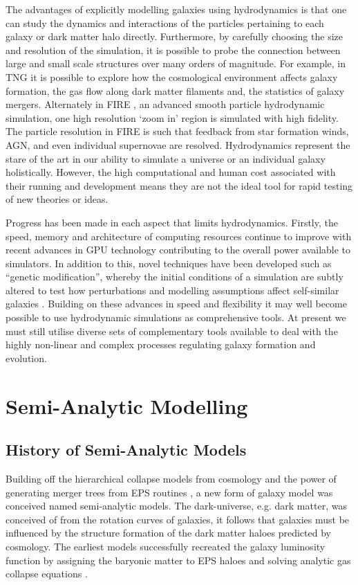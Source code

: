 The advantages of explicitly modelling galaxies using hydrodynamics is that one can study the dynamics and interactions of the particles pertaining to each galaxy or dark matter halo directly. Furthermore, by carefully choosing the size and resolution of the simulation, it is possible to probe the connection between large and small scale structures over many orders of magnitude. For example, in TNG it is possible to explore how the cosmological environment affects galaxy formation, the gas flow along dark matter filaments and, the statistics of galaxy mergers. 
Alternately in FIRE \cite{Hopkins2018FIRE-2Formation}, an advanced smooth particle hydrodynamic simulation, one high resolution `zoom in' region is simulated with high fidelity. The particle resolution in FIRE is such that feedback from star formation winds, AGN, and even individual supernovae are resolved. Hydrodynamics represent the stare of the art in our ability to simulate a universe or an individual galaxy holistically. However, the high computational and human cost associated with their running and development means they are not the ideal tool for rapid testing of new theories or ideas. 

Progress has been made in each aspect that limits hydrodynamics. Firstly, the speed, memory and architecture of computing resources continue to improve with recent advances in GPU technology contributing to the overall power available to simulators. In addition to this, novel techniques have been developed such as ``genetic modification'', whereby the initial conditions of a simulation are subtly altered to test how perturbations and modelling assumptions affect self-similar galaxies \citep{Pontzen2017HowGalaxy}. Building on these advances in speed and flexibility it may well become possible to use hydrodynamic simulations as comprehensive tools. At present we must still utilise diverse sets of complementary tools available to deal with the highly non-linear and complex processes regulating galaxy formation and evolution.

\section{Semi-Analytic Modelling}
\label{sec:SAM}
\subsection{History of Semi-Analytic Models}
Building off the hierarchical collapse models from \LCDM cosmology and the power of generating merger trees from EPS routines \citep{Press1974}, a new form of galaxy model was conceived named semi-analytic models. The dark-universe, e.g. dark matter, was conceived of from the rotation curves of galaxies, it follows that galaxies must be influenced by the structure formation of the dark matter haloes predicted by \LCDM cosmology. The earliest models successfully recreated the galaxy luminosity function by assigning the baryonic matter to EPS haloes and solving analytic gas collapse equations \citep{White1978CoreClustering}.

